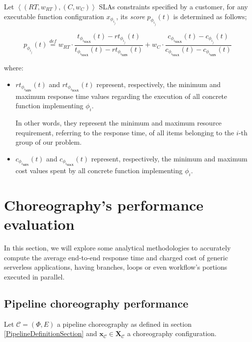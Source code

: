 \documentclass[12pt,a4paper]{report}
\newcommand{\mathDef}{\overset{\textit{def}}{=}}
\begin{document}
Let $\left\langle (RT,w_{RT}),(C,w_{C}) \right\rangle$ SLAs constraints specified by a customer, for any executable function configuration $x_{\phi_{i_j}}$, its \textit{score} $p_{\phi_{i_{j}}}(t)$ is determined as follows;

\begin{equation}
	p_{\phi_{i_{j}}}(t) \mathDef w_{RT} \cdot \dfrac{t_{\phi_{i_{\textbf{MAX}}}}(t) - rt_{\phi_{i_{j}}}(t)}{t_{\phi_{i_{\textbf{MAX}}}}(t) - rt_{\phi_{i_{\textbf{MIN}}}}(t)} + w_{C} \cdot \dfrac{c_{\phi_{i_{\textbf{MAX}}}}(t) - c_{\phi_{i_{j}}}(t)}{c_{\phi_{i_{\textbf{MAX}}}}(t) - c_{\phi_{i_{\textbf{MIN}}}}(t)}
\end{equation}

where:

\begin{itemize}
	\item $rt_{\phi_{i_{\textbf{MIN}}}}(t)$ and $rt_{\phi_{i_{\textbf{MAX}}}}(t)$ represent, respectively, the minimum and maximum response time values regarding the execution of all concrete function implementing $\phi_i$. 
	
	In other words, they represent the minimum and maximum resource requirement, referring to the response time, of all items belonging to the $i$-th group of our problem.
	
	\item $c_{\phi_{i_{\textbf{MIN}}}}(t)$ and $c_{\phi_{i_{\textbf{MAX}}}}(t)$ represent, respectively, the minimum and maximum cost values spent by all concrete function implementing $\phi_i$.
\end{itemize}




\section{Choreography's performance evaluation}

In this section, we will explore some analytical methodologies to accurately compute the average end-to-end response time and charged cost of generic serverless applications, having branches, loops or even workflow's portions executed in parallel.

\subsection{Pipeline choreography performance}

Let $\mathcal{C} = (\Phi,E)$ a pipeline choreography as defined in section \ref{PipelineDefinitionSection} and $\textbf{x}_{\mathcal{C}} \in \textbf{X}_{\mathcal{C}}$ a choreography configuration.
\end{document}
